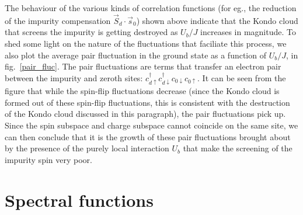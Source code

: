 \documentclass{report}
\numberwithin{equation}{section}
\begin{document}
The behaviour of the various kinds of correlation functions (for eg., the reduction of the impurity compensation \(\vec{S}_d\cdot\vec{s}_0\)) shown above indicate that the Kondo cloud that screens the impurity is getting destroyed as \(U_b/J\) increases in magnitude. To shed some light on the nature of the fluctuations that faciliate this process, we also plot the average pair fluctuation in the ground state as a function of \(U_b/J\), in fig.~\ref{pair_fluc}. The pair fluctuations are terms that transfer an electron pair between the impurity and zeroth sites: \(c^\dagger_{d \uparrow}c^\dagger_{d \downarrow} c_{0 \downarrow}c_{0 \uparrow}\). It can be seen from the figure that while the spin-flip fluctuations decrease (since the Kondo cloud is formed out of these spin-flip fluctuations, this is consistent with the destruction of the Kondo cloud discussed in this paragraph), the pair fluctuations pick up. Since the spin subspace and charge subspace cannot coincide on the same site, we can then conclude that it is the growth of these pair fluctuations brought about by the presence of the purely local interaction \(U_b\) that make the screening of the impurity spin very poor.

\section{Spectral functions}
\end{document}
